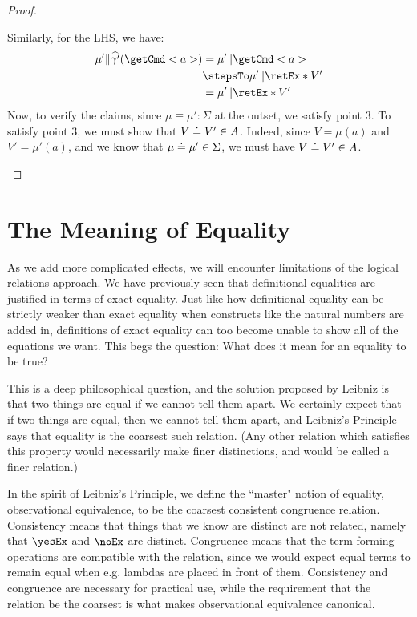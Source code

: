 \documentclass[letterpaper]{article}
\begin{document}
\begin{proof}
\begin{itemize}
        Similarly, for the LHS, we have: 
        \begin{align*}
            \mu' \Vert \widehat{\gamma'}(\getCmd<a>) 
            &= \mu' \Vert \getCmd<a>\\
            &\stepsTo \mu' \Vert \retEx*{V'}\\
            &= \mu' \Vert \retEx*{V'}
        \end{align*}
        Now, to verify the claims, since $\mu \equiv \mu' : \Sigma$ at the outset, we satisfy point $3$. To satisfy point $3$, we must show that $V\mathrel{\doteq}V' \in A$. Indeed, since $V = \mu(a)$ and $V' = \mu'(a)$, and we know that $\mu\mathrel{\doteq}\mu' \in \Sigma$, we must have $V\mathrel{\doteq}V' \in A$.
\end{itemize}
\end{proof}

\section{The Meaning of Equality}

As we add more complicated effects, we will encounter limitations of the logical relations approach.
We have previously seen that definitional equalities are justified in terms of exact equality.
Just like how definitional equality can be strictly weaker than exact equality when constructs like the natural numbers are added in, definitions of exact equality can too become unable to show all of the equations we want.
This begs the question: What does it mean for an equality to be true?

This is a deep philosophical question, and the solution proposed by Leibniz is that two things are equal if we cannot tell them apart.
We certainly expect that if two things are equal, then we cannot tell them apart, and Leibniz's Principle says that equality is the coarsest such relation.
(Any other relation which satisfies this property would necessarily make finer distinctions, and would be called a finer relation.)

In the spirit of Leibniz's Principle, we define the ``master" notion of equality, observational equivalence, to be the coarsest consistent congruence relation.
Consistency means that things that we know are distinct are not related, namely that \(\yesEx\) and \(\noEx\) are distinct.
Congruence means that the term-forming operations are compatible with the relation, since we would expect equal terms to remain equal when e.g. lambdas are placed in front of them.
Consistency and congruence are necessary for practical use, while the requirement that the relation be the coarsest is what makes observational equivalence canonical.
\end{document}
